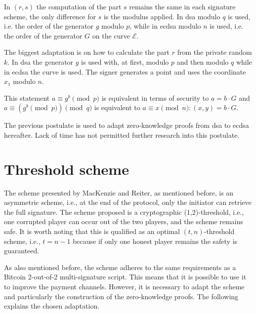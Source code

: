 In $(r, s)$ the computation of the part $s$ remains the same in each signature
scheme, the only difference for $s$ is the modulus applied. In \gls{dsa}
modulo $q$ is used, i.e. the order of the generator $g$ modulo $p$,  while in
\gls{ecdsa} modulo $n$ is used, i.e. the order of the generator $G$ on the
curve $\mathcal{E}$.

The biggest adaptation is on how to calculate the part $r$ from the private
random $k$. In \gls{dsa} the generator $g$ is used with, at first, modulo $p$
and then modulo $q$ while in \gls{ecdsa} the curve is used. The signer generates
a point and uses the coordinate $x_1$ modulo $n$.

\begin{postulate}
  This statement $a \equiv g^b \pmod p$ is equivalent in terms of security to $a = b \cdot G$
  and $a \equiv (g^b \pmod p) \pmod q$ is equivalent to $a \equiv x \pmod n : (x, y) = b \cdot G$.
  \label{post:adaptEcdsa}
\end{postulate}

The previous postulate is used to adapt zero-knowledge proofs from \gls{dsa} to
\gls{ecdsa} hereafter. Lack of time has not permitted further research into this
postulate.


\section{Threshold scheme}

The  scheme presented by MacKenzie
and Reiter, as mentioned before, is an asymmetric scheme, i.e., at the end of
the protocol, only the initiator can retrieve the full signature. The scheme
proposed is a cryptographic (1,2)-threshold, i.e., one corrupted player can
occur out of the two players, and the scheme remains safe. It is worth noting that
this is qualified as an optimal $(t, n)$-threshold scheme, i.e., $t = n - 1$
because if only one honest player remains the safety is guaranteed.

As also mentioned before, the scheme adheres to the same requirements as a
Bitcoin 2-out-of-2 multi-signature script. This means that it is possible to
use it to improve the payment channels. However, it is necessary to adapt the
scheme and particularly the construction of the zero-knowledge proofs. The following
explains the chosen adaptation.


